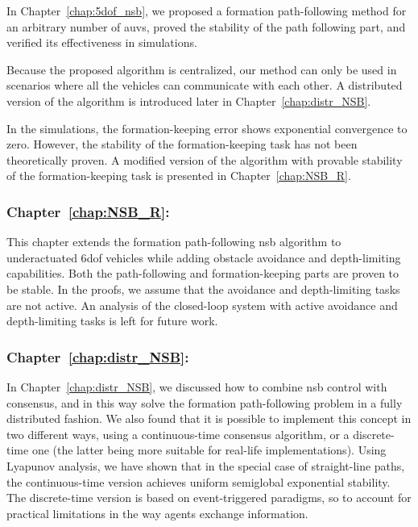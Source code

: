 In Chapter~\ref{chap:5dof_nsb}, we proposed a formation path-following method for an arbitrary number of \glspl{auv}, proved the stability of the path following part, and verified its effectiveness in simulations.

Because the proposed algorithm is centralized, our method can only be used in scenarios where all the vehicles can communicate with each other.
A distributed version of the algorithm is introduced later in Chapter~\ref{chap:distr_NSB}.

In the simulations, the formation-keeping error shows exponential convergence to zero.
However, the stability of the formation-keeping task has not been theoretically proven.
A modified version of the algorithm with provable stability of the formation-keeping task is presented in Chapter~\ref{chap:NSB_R}.

\subsubsection{Chapter~\ref{chap:NSB_R}: }

This chapter extends the formation path-following \gls{nsb} algorithm to underactuated 6\gls{dof} vehicles while adding obstacle avoidance and depth-limiting capabilities. 
Both the path-following and formation-keeping parts are proven to be stable.     
In the proofs, we assume that the avoidance and depth-limiting tasks are not active.
An analysis of the closed-loop system with active avoidance and depth-limiting tasks is left for future work.

\subsubsection{Chapter~\ref{chap:distr_NSB}: }

In Chapter~\ref{chap:distr_NSB}, we discussed how to combine \acrlong{nsb} control with consensus, and in this way solve the formation path-following problem in a fully distributed fashion. We also found that it is possible to implement this concept in two different ways, using a continuous-time consensus algorithm, or a discrete-time one (the latter being more suitable for real-life implementations).
Using Lyapunov analysis, we have shown that in the special case of straight-line paths, the continuous-time version achieves uniform semiglobal exponential stability.
The discrete-time version is based on event-triggered paradigms, so to account for practical limitations in the way agents exchange information.

